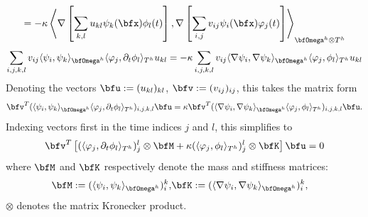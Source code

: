 \begin{example}
\begin{multline}
            =  - \kappa\left\langle\nabla\left[\sum_{k, l}u_{kl}\psi_{k}(\bfx)\phi_{l}(t)\right], \nabla\left[\sum_{i, j}v_{ij}\psi_{i}(\bfx)\varphi_{j}(t)\right]\right\rangle_{\bfOmega^{h}\otimes T^{h}}
        \end{multline}
        \begin{equation}
            \sum_{i, j, k, l}v_{ij}\langle\psi_{i}, \psi_{k}\rangle_{\bfOmega^{h}}\langle\varphi_{j}, \partial_{t}\phi_{l}\rangle_{T^{h}}u_{kl}  =  - \kappa\sum_{i, j, k, l}v_{ij}\langle\nabla\psi_{i}, \nabla\psi_{k}\rangle_{\bfOmega^{h}}\langle\varphi_{j}, \phi_{l}\rangle_{T^{h}}u_{kl}
        \end{equation}
        Denoting the vectors $\bfu  :=  (u_{kl})_{kl}$, $\bfv  :=  (v_{ij})_{ij}$, this takes the matrix form
        \begin{equation}
            \bfv^{T}(\langle\psi_{i}, \psi_{k}\rangle_{\bfOmega^{h}}\langle\varphi_{j}, \partial_{t}\phi_{l}\rangle_{T^{h}})_{i, j, k, l}\bfu  =  \kappa\bfv^{T}(\langle\nabla\psi_{i}, \nabla\psi_{k}\rangle_{\bfOmega^{h}}\langle\varphi_{j}, \phi_{l}\rangle_{T^{h}})_{i, j, k, l}\bfu.
        \end{equation}
        Indexing vectors first in the time indices $j$ and $l$, this simplifies to
        \begin{equation}
            \bfv^{T}\left[(\langle\varphi_{j}, \partial_{t}\phi_{l}\rangle_{T^{h}})_{j}^{l}\otimes\bfM + \kappa(\langle\varphi_{j}, \phi_{l}\rangle_{T^{h}})_{j}^{l}\otimes\bfK\right]\bfu  =  0
        \end{equation}
        where $\bfM$ and $\bfK$ respectively denote the mass and stiffness matrices:
        \begin{align}
            \bfM  :=  (\langle\psi_{i}, \psi_{k}\rangle_{\bfOmega^{h}})_{i}^{k},  &
            \bfK  :=  (\langle\nabla\psi_{i}, \nabla\psi_{k}\rangle_{\bfOmega^{h}})_{i}^{k},
        \end{align}
        $\otimes$ denotes the matrix Kronecker product.
        

\end{example}
